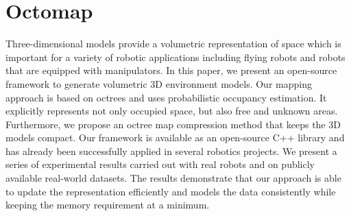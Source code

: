 
\chapter{Octomap}\label{chap:OctoMap}

Three-dimensional models provide a volumetric representation of space which is important for a variety of robotic applications including flying robots and robots that are equipped with manipulators. In this paper, we present an open-source framework to generate volumetric 3D environment models. Our mapping approach is based on octrees and uses probabilistic occupancy estimation. It explicitly represents not only occupied space, but also free and unknown areas. Furthermore, we propose an octree map compression method that keeps the 3D models compact. Our framework is available as an open-source C++ library and has already been successfully applied in several robotics projects. We present a series of experimental results carried out with real robots and on publicly available real-world datasets. The results demonstrate that our approach is able to update the representation efficiently and models the data consistently while keeping the memory requirement at a minimum.

 \cleardoublepage

%
%
%
